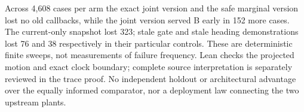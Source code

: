 \documentclass{article}
\begin{document}
Across 4,608 cases per arm the exact joint version and the
safe marginal version lost no old callbacks, while the joint
version served B early in 152 more cases. The current-only
snapshot lost 323; stale gate and stale heading demonstrations
lost 76 and 38 respectively in their particular controls.
These are deterministic finite sweeps, not measurements of
failure frequency. Lean checks the projected motion and exact
clock boundary; complete source interpretation is separately
reviewed in the trace proof. No independent holdout or
architectural advantage over the equally informed comparator,
nor a deployment law connecting the two upstream plants.
\end{document}
